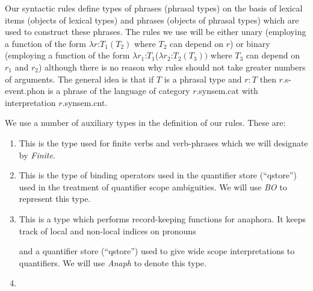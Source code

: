 Our syntactic rules define types of phrases (phrasal types) on the basis of lexical
items (objects of lexical types) and phrases (objects of phrasal
types) which are used to construct these phrases.  The
rules we use will be either unary (employing a function of the form $\lambda
r$:$T_1(T_2)$ where $T_2$ can depend on $r$)
or binary (employing a function of the form $\lambda r_1$:$T_1$($\lambda r_2$:$T_2(T_3))$ where
$T_3$ can depend on $r_1$ and $r_2$)
although there is no reason why rules should not take
greater numbers of arguments.  The general idea is that if $T$ is a
phrasal type and $r:T$ then $r.$s-event.phon is a phrase of the
language of category $r$.synsem.cat with interpretation $r$.synsem.cnt.

We use a number of auxiliary types in the definition of our rules.
These are:
\begin{enumerate}

\renewcommand{\labelenumi}{Ty\arabic{enumi}.}

\item

This is the type used for finite verbs and verb-phrases which we will
designate by \textit{Finite}.

\item {}

This is the type of binding operators used in the quantifier store
(``qstore'') used in the treatment of quantifier scope ambiguities.
We will use \textit{BO} to represent this type.
 
\item

This is a type which performs record-keeping functions for anaphora.
It keeps track of local and non-local indices on pronouns and a quantifier store (``qstore'') used to give
wide scope interpretations to quantifiers.  We will use \textit{Anaph}
to denote this type.
 
\item  {}


\end{enumerate}
